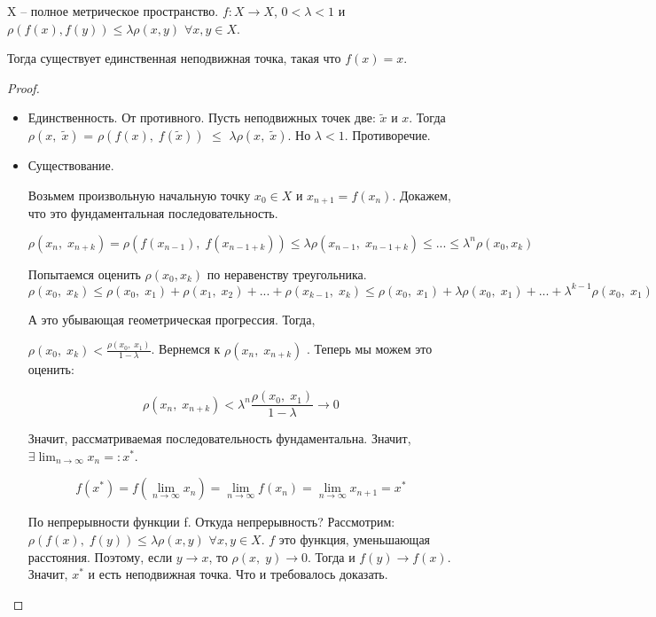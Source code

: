 
\begin{theorem} \thmslashn
	
	X – полное метрическое пространство. $f: X \rightarrow X$,\; $0 < \lambda < 1$ и $\rho(f(x),f(y)) \leq \lambda \rho(x, y)$ $\forall x, y \in X$. 
	
	Тогда существует единственная неподвижная точка, такая что $f(x) = x$.
	\begin{proof} \thmslashn
		
		\begin{itemize}
			\item Единственность.
			От противного. Пусть неподвижных точек две: $\widetilde{x}$ и $x$. Тогда $\rho(x,\;\widetilde{x})$ = $\rho(f(x),\;f(\widetilde{x}))$ $\leq$
			$\lambda \rho(x,\;\widetilde{x})$. Но $\lambda < 1$. Противоречие.
			
			\item Существование.
			
			Возьмем произвольную начальную точку $x_0 \in X$ и $x_{n+1} = f(x_n)$. Докажем, что это фундаментальная последовательность.
			
			$$\rho(x_n,\;x_{n + k}) = \rho(f(x_{n-1}),\;f(x_{n - 1 + k})) \leq \lambda \rho(x_{n-1},\; x_{n-1+k}) \leq ... \leq \lambda^n \rho(x_0, x_k)$$
			
			Попытаемся оценить $\rho(x_0, x_k)$ по неравенству треугольника.
			$$
			\rho(x_{0},\; x_{k}) \leq \rho(x_{0},\; x_{1}) + \rho(x_{1},\; x_{2}) + ... + \rho(x_{k-1},\; x_{k}) \leq \rho(x_{0},\; x_{1}) + \lambda \rho(x_{0},\; x_{1}) + ... + \lambda^{k-1}\rho(x_{0},\; x_{1})
			$$
			
			А это убывающая геометрическая прогрессия. Тогда, 
			
			$
			\rho(x_{0},\; x_{k}) < \frac{\rho(x_{0},\; x_{1})}{1 - \lambda}
			$. Вернемся к $\rho(x_n,\;x_{n + k})$ . Теперь мы можем это оценить:
			
			$$
			\rho(x_n,\;x_{n + k}) < \lambda^n \frac{\rho(x_{0},\; x_{1})}{1 - \lambda} \longrightarrow 0
			$$
			
			Значит, рассматриваемая последовательность фундаментальна. Значит, $\exists \lim_{n\rightarrow \infty} x_n =: x^*  $.
			
			$$
			f(x^*) = f(\lim_{n\rightarrow \infty} x_n) = \lim_{n\rightarrow \infty} f(x_n) = \lim_{n\rightarrow \infty} x_{n+1} = x^* 
			$$ 
			
			По непрерывности функции f. Откуда непрерывность? Рассмотрим: $\rho(f(x),\;f(y)) \leq \lambda \rho(x, y)$ $\forall x, y \in X$. $f$ это функция, уменьшающая расстояния. Поэтому, если $y \rightarrow x$, то $\rho (x,\; y) \rightarrow 0$. Тогда и $f(y) \rightarrow f(x)$. 
			Значит, $x^*$ и есть неподвижная точка. Что и требовалось доказать.
		\end{itemize}
	\end{proof}
	
\end{theorem}

